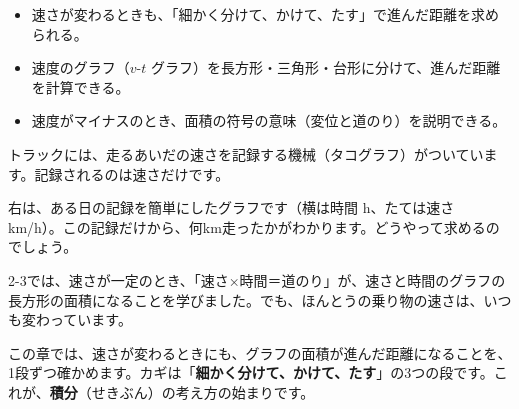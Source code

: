 
\begin{goal}
\begin{itemize}[label={\color{bkTheme}●}, leftmargin=1.6\zw, itemsep=0pt, topsep=1pt]
\item {}\enspace 速さが変わるときも、「細かく分けて、かけて、たす」で進んだ距離を求められる。
\item {}\enspace 速度のグラフ（$v$-$t$ グラフ）を長方形・三角形・台形に分けて、進んだ距離を計算できる。
\item {}\enspace 速度がマイナスのとき、面積の符号の意味（変位と道のり）を説明できる。
\end{itemize}
\end{goal}

\begin{hatena}
\noindent\begin{minipage}[c]{0.58\linewidth}\raggedright
トラックには、走るあいだの速さを記録する機械（タコグラフ）がついています。記録されるのは速さだけです。

右は、ある日の記録を簡単にしたグラフです（横は時間 h、たては速さ km/h）。この記録だけから、\mbox{何km}走ったかがわかります。どうやって求めるのでしょう。
\end{minipage}\hfill
\begin{minipage}[c]{0.4\linewidth}\centering
{}
\end{minipage}
\end{hatena}

2-3では、速さが一定のとき、「速さ×時間＝道のり」が、速さと時間のグラフの長方形の面積になることを学びました。でも、ほんとうの乗り物の速さは、いつも変わっています。

この章では、速さが変わるときにも、グラフの面積が進んだ距離になることを、1段ずつ確かめます。カギは「\textbf{細かく分けて、かけて、たす}」の3つの段です。これが、\textbf{積分}（せきぶん）の考え方の始まりです。

